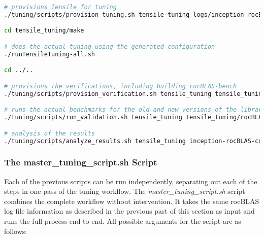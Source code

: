 \documentclass[]{article}
\begin{document}
\begin{lstlisting}[language=bash,breaklines=true]
# provisions Tensile for tuning
./tuning/scripts/provision_tuning.sh tensile_tuning logs/inception-rocBLAS-configs_unique.log tf_inception.yaml vega20

cd tensile_tuning/make

# does the actual tuning using the generated configuration
./runTensileTuning-all.sh

cd ../..

# provisions the verifications, including building rocBLAS-bench
./tuning/scripts/provision_verification.sh tensile_tuning tensile_tuning/tensile/Tensile vega20

# runs the actual benchmarks for the old and new versions of the library
./tuning/scripts/run_validation.sh tensile_tuning tensile_tuning/rocBLAS/

# analysis of the results
./tuning/scripts/analyze_results.sh tensile_tuning inception-rocBLAS-configs_unique.log vega20 -s 2 -f 1301
\end{lstlisting}

\subsubsection{The master\_tuning\_script.sh Script}

Each of the previous scripts can be run independently, separating out each of the steps in one pass of the tuning workflow. The \emph{master\_tuning\_script.sh} script combines the complete workflow without intervention. It takes the same rocBLAS log file information as described in the previous part of this section as input and runs the full process end to end. All possible arguments for the script are as follows:
\end{document}
